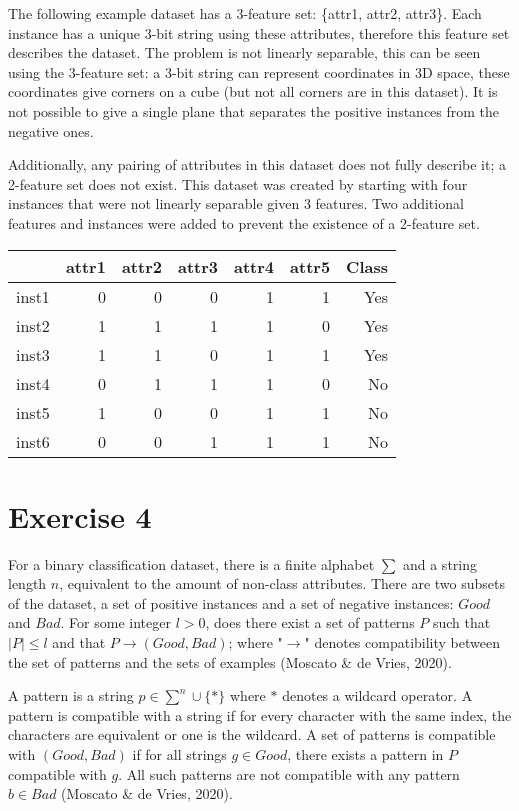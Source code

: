 \documentclass[11pt, a4paper]{article}
\begin{document}
The following example dataset has a 3-feature set: \{attr1, attr2, attr3\}. Each instance has a unique 3-bit string using these attributes, therefore this feature set describes the dataset. The problem is not linearly separable, this can be seen using the 3-feature set: a 3-bit string can represent coordinates in 3D space, these coordinates give corners on a cube (but not all corners are in this dataset). It is not possible to give a single plane that separates the positive instances from the negative ones.

Additionally, any pairing of attributes in this dataset does not fully describe it; a 2-feature set does not exist. This dataset was created by starting with four instances that were not linearly separable given 3 features. Two additional features and instances were added to prevent the existence of a 2-feature set.

\begin{center}
\begin{tabular}{|l|r|r|r|r|r|r|}
\hline
    & attr1 & attr2 & attr3 & attr4 & attr5 & Class\\
\hline
inst1 & 0 & 0 & 0 & 1 & 1 & Yes\\
\hline
inst2 & 1 & 1 & 1 & 1 & 0 & Yes\\
\hline
inst3 & 1 & 1 & 0 & 1 & 1 & Yes\\
\hline
inst4 & 0 & 1 & 1 & 1 & 0 & No\\
\hline
inst5 & 1 & 0 & 0 & 1 & 1 & No\\
\hline
inst6 & 0 & 0 & 1 & 1 & 1 & No\\
\hline
\end{tabular}
\end{center}

\section{Exercise 4}
For a binary classification dataset, there is a finite alphabet $\sum$ and a string length $n$, equivalent to the amount of non-class attributes. There are two subsets of the dataset, a set of positive instances and a set of negative instances: $Good$ and $Bad$. For some integer $l > 0$, does there exist a set of patterns $P$ such that $|P| \leq l$ and that $P\rightarrow(Good, Bad)$; where "$\rightarrow$" denotes compatibility between the set of patterns and the sets of examples (Moscato \& de Vries, 2020).

A pattern is a string $p \in \sum^n \cup \{*\}$ where $*$ denotes a wildcard operator. A pattern is compatible with a string if for every character with the same index, the characters are equivalent or one is the wildcard. A set of patterns is compatible with $(Good, Bad)$ if for all strings $g \in Good$, there exists a pattern in $P$ compatible with $g$. All such patterns are not compatible with any pattern $b \in Bad$ (Moscato \& de Vries, 2020).
\end{document}
